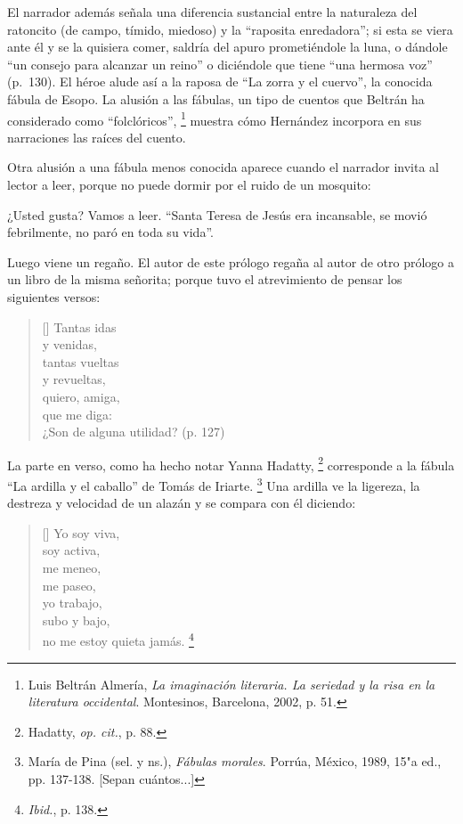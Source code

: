 \documentclass[14pt,twoside,final]{extbook} %
\let\oldfootnote\footnote
\renewcommand\footnote[1]{%
\oldfootnote{\hspace{1mm}#1}}
\begin{document}
El narrador además señala una diferencia sustancial entre la naturaleza del ratoncito (de campo, tímido, miedoso) y la ``raposita enredadora''; si esta se viera ante él y se la quisiera comer, saldría del apuro prometiéndole la luna, o dándole ``un consejo para alcanzar un reino'' o diciéndole que tiene ``una hermosa voz'' (p.~130). El héroe alude así a la raposa de ``La zorra y el cuervo'', la conocida fábula de Esopo. La alusión a las fábulas, un tipo de cuentos que Beltrán ha considerado como ``folclóricos'',\footnote{Luis Beltrán Almería, \emph{La imaginación literaria. La seriedad y la risa en la literatura occidental}. Montesinos, Barcelona, 2002, p. 51.} muestra cómo Hernández incorpora en sus narraciones las raíces del cuento.\protect\enlargethispage*{\baselineskip}

Otra alusión a una fábula menos conocida aparece cuando el narrador invita al lector a leer, porque no puede dormir por el ruido de un mosquito:
\begin{quoting}
¿Usted gusta? Vamos a leer. ``Santa Teresa de Jesús era incansable, se movió febrilmente, no paró en toda su vida''.

Luego viene un regaño. El autor de este prólogo regaña al autor de otro prólogo a un libro de la misma señorita; porque tuvo el atrevimiento de pensar los siguientes versos:
\settowidth{\versewidth}{¿Son de alguna utilidad? (p. 127)}
\begin{verse}[\versewidth]
Tantas idas \\
y venidas, \\
tantas vueltas \\
y revueltas, \\
quiero, amiga, \\
que me diga: \\
¿Son de alguna utilidad? (p. 127)
\end{verse}
\end{quoting}
La parte en verso, como ha hecho notar Yanna Hadatty,\footnote{Hadatty, \emph{op. cit.}, p. 88.} corresponde a la fábula ``La ardilla y el caballo'' de Tomás de Iriarte.\footnote{María de Pina (sel. y ns.), \emph{Fábulas morales}. Porrúa, México, 1989, 15"a ed., pp. 137-138. [Sepan cuántos...]} Una ardilla ve la ligereza, la destreza y velocidad de un alazán y se compara con él
diciendo:
\settowidth{\versewidth}{no me estoy quieta jamás.\footnote{\emph{Ibid.}, p. 138.}}
\begin{verse}[\versewidth]
Yo soy viva, \\
soy activa, \\
me meneo, \\
me paseo, \\
yo trabajo, \\
subo y bajo, \\
no me estoy quieta jamás.\footnote{\emph{Ibid.}, p. 138.}
\end{verse}
\end{document}
